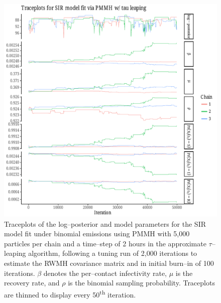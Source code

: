 \begin{figure}[htbp]
	\centering
	\includegraphics[width=\linewidth]{figures/bbs_sir_pmmh_traceplots.pdf}
	\caption{Traceplots of the log--posterior and model parameters for the SIR model fit under binomial emissions using PMMH with 5,000 particles per chain and a time--step of 2 hours in the approximate $ \tau $--leaping algorithm, following a tuning run of 2,000 iterations to estimate the RWMH covariance matrix and in initial burn--in of 100 iterations. $ \beta $ denotes the per--contact infectivity rate, $ \mu $ is the recovery rate, and $ \rho $ is the binomial sampling probability. Traceplots are thinned to display every 50\textsuperscript{th} iteration.}
	\label{fig:bbs_sir_pmmh_traceplots}
\end{figure}

